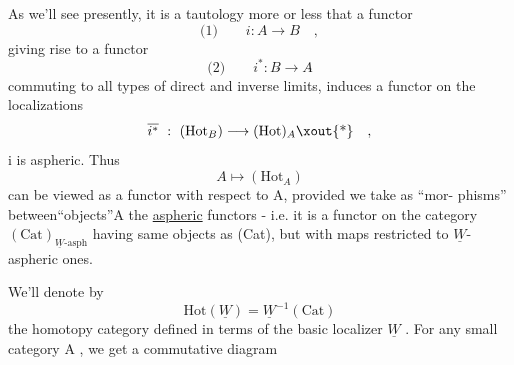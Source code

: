 As we'll see presently, it is a tautology more or less that a
functor
\[ \text{(1)} \qquad i\colon A \longrightarrow B \quad , \]
giving rise to a functor
\[ \text{(2)} \qquad i^{*}\colon B\hat{} \longrightarrow A\hat{} \]
\hand{(}commuting to all types of direct and inverse limits,\hand{)} induces a functor
on the localizations
\[ \overline{i^{*}} \ : \ (\mathrm{Hot}_{B}) \longrightarrow (\mathrm{Hot})_{A}\text{\xout{*}} \quad , \]
  i is  aspheric. Thus
\[ A \longmapsto (\mathrm{Hot}_{A}) \]
can be viewed as a functor with respect to A, provided we take as ``mor-%
phisms'' between``objects''A the \uline{aspheric} functors  - i.e. it is a functor
on the category    $(\mathrm{Cat})_{\underline{W}\text{-asph}}$  having same objects as (Cat),
but with maps restricted to  $\underline{W}$-aspheric ones.

We'll denote by
\[ \mathrm{Hot}(\underline{W}) = \underline{W}^{-1}(\mathrm{Cat}) \]
the homotopy category defined in terms of the basic localizer $\underline{W}$ . For
any small category A , we get a commutative diagram

